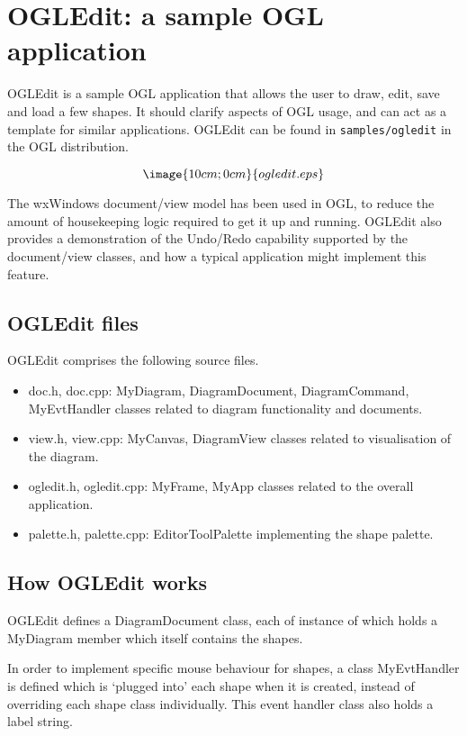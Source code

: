 \chapter{OGLEdit: a sample OGL application}\label{ogledit}%
%
\setfooter{\thepage}{}{}{}{}{\thepage}

OGLEdit is a sample OGL application that allows the user to draw, edit,
save and load a few shapes. It should clarify aspects of OGL usage, and
can act as a template for similar applications. OGLEdit can be found in\rtfsp
{\tt samples/ogledit} in the OGL distribution.

$$\image{10cm;0cm}{ogledit.eps}$$\par

The wxWindows document/view model has been used in OGL, to reduce the amount of
housekeeping logic required to get it up and running. OGLEdit also provides
a demonstration of the Undo/Redo capability supported by the document/view classes,
and how a typical application might implement this feature.

\section{OGLEdit files}

OGLEdit comprises the following source files.

\begin{itemize}\itemsep=0pt
\item doc.h, doc.cpp: MyDiagram, DiagramDocument, DiagramCommand, MyEvtHandler
classes related to diagram functionality and documents.
\item view.h, view.cpp: MyCanvas, DiagramView classes related to visualisation of
the diagram.
\item ogledit.h, ogledit.cpp: MyFrame, MyApp classes related to the overall application.
\item palette.h, palette.cpp: EditorToolPalette implementing the shape palette.
\end{itemize}

\section{How OGLEdit works}

OGLEdit defines a DiagramDocument class, each of instance of which holds a MyDiagram
member which itself contains the shapes.

In order to implement specific mouse behaviour for shapes, a class MyEvtHandler is
defined which is `plugged into' each shape when it is created, instead of overriding each shape class
individually. This event handler class also holds a label string.

